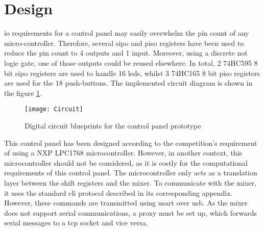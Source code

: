 \documentclass[../main.tex]{subfiles}
\begin{document}
\section{Design}
\Gls{io} requirements for a control panel may easily overwhelm the pin count of any micro-controller. Therefore, several \gls{sipo} and \gls{piso} registers have been used to reduce the pin count to 4 outputs and 1 input. Moreover, using a discrete not logic gate, one of those outputs could be reused elsewhere. In total, 2 74HC595 8 bit \gls{sipo} registers are used to handle 16 \glspl{led}, whilst 3 74HC165 8 bit \gls{piso} registers are used for the 18 push-buttons. The implemented circuit diagram is shown in the figure \ref{fig:control_panel_proto_circuit}.\newline

\begin{landscape}
\begin{figure}[hbtp]
    \centering
    \vspace{-26pt} %
    \texttt{[image: Circuit]}

    \caption{Digital circuit blueprints for the control panel prototype}
    \label{fig:control_panel_proto_circuit}
\end{figure}
\end{landscape}


This control panel has been designed according to the competition's requirement of using a NXP LPC1768 microcontroller. However, in another context, this microcontroller should not be considered, as it is costly for the computational requirements of this control panel. The microcontroller only acts as a translation layer between the shift registers and the mixer. To communicate with the mixer, it uses the standard \gls{cli} protocol described in its corresponding appendix. However, these commands are transmitted using \gls{usart} over \gls{usb}. As the mixer does not support serial communications, a proxy must be set up, which forwards serial messages to a \gls{tcp} socket and vice versa.
\end{document}
